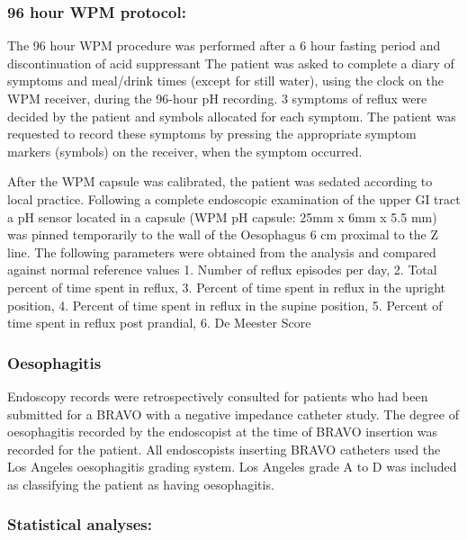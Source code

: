 \documentclass[english,man,floatsintext]{apa6}
\begin{document}
\hypertarget{hour-wpm-protocol}{%
\subsubsection{96 hour WPM protocol:}\label{hour-wpm-protocol}}

The 96 hour WPM procedure was performed after a 6 hour fasting period and discontinuation of acid suppressant The patient was asked to complete a diary of symptoms and meal/drink times (except for still water), using the clock on the WPM receiver, during the 96-hour pH recording. 3 symptoms of reflux were decided by the patient and symbols allocated for each symptom. The patient was requested to record these symptoms by pressing the appropriate symptom markers (symbols) on the receiver, when the symptom occurred.

After the WPM capsule was calibrated, the patient was sedated according to local practice. Following a complete endoscopic examination of the upper GI tract a pH sensor located in a capsule (WPM pH capsule: 25mm x 6mm x 5.5 mm) was pinned temporarily to the wall of the Oesophagus 6 cm proximal to the Z line.
The following parameters were obtained from the analysis and compared against normal reference values 1. Number of reflux episodes per day, 2. Total percent of time spent in reflux, 3. Percent of time spent in reflux in the upright position, 4. Percent of time spent in reflux in the supine position, 5. Percent of time spent in reflux post prandial, 6. De Meester Score

\hypertarget{oesophagitis}{%
\subsubsection{Oesophagitis}\label{oesophagitis}}

Endoscopy records were retrospectively consulted for patients who had been submitted for a BRAVO with a negative impedance catheter study. The degree of oesophagitis recorded by the endoscopist at the time of BRAVO insertion was recorded for the patient. All endoscopists inserting BRAVO catheters used the Los Angeles oesophagitis grading system. Los Angeles grade A to D was included as classifying the patient as having oesophagitis.

\hypertarget{statistical-analyses}{%
\subsubsection{Statistical analyses:}\label{statistical-analyses}}
\end{document}
